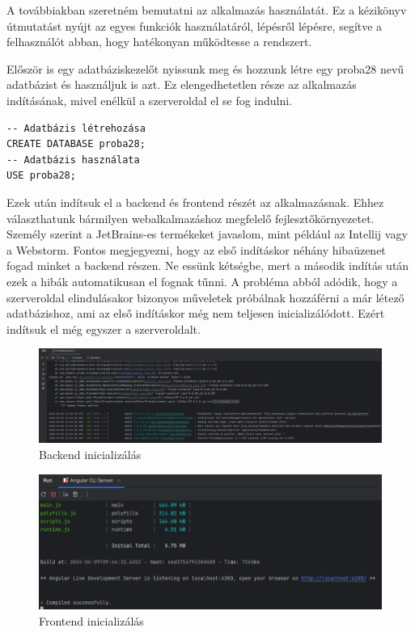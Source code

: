 
A továbbiakban szeretném bemutatni az alkalmazás használatát. Ez a kézikönyv útmutatást nyújt az egyes funkciók használatáról, lépésről lépésre, segítve a felhasználót abban, hogy hatékonyan működtesse a rendszert.


Először is egy adatbáziskezelőt nyissunk meg és hozzunk létre egy proba28 nevű adatbázist és használjuk is azt. Ez elengedhetetlen része az alkalmazás indításának, mivel enélkül a szerveroldal el se fog indulni.


\begin{lstlisting}
-- Adatbázis létrehozása
CREATE DATABASE proba28;
-- Adatbázis használata
USE proba28;
\end{lstlisting}

Ezek után indítsuk el a backend és frontend részét az alkalmazásnak. Ehhez választhatunk bármilyen webalkalmazáshoz megfelelő fejlesztőkörnyezetet. Személy szerint a JetBrains-es termékeket javaslom, mint például az Intellij vagy a Webstorm. Fontos megjegyezni, hogy az első indításkor néhány hibaüzenet fogad minket a backend részen. Ne essünk kétségbe, mert a második indítás után ezek a hibák automatikusan el fognak tűnni. A probléma abból adódik, hogy a szerveroldal elindulásakor bizonyos műveletek próbálnak hozzáférni a már létező adatbázishoz, ami az első indításkor még nem teljesen inicializálódott. Ezért indítsuk el még egyszer a szerveroldalt.

\begin{figure}[h]
\centering
\includegraphics[width=\textwidth]{images/backend_running.png}
\caption{Backend inicializálás}
\label{fig:backend}
\end{figure}

\begin{figure}[h]
\centering
\includegraphics[width=\textwidth]{images/frontend_running.png}
\caption{Frontend inicializálás}
\label{fig:frontend}
\end{figure}
\newpage

